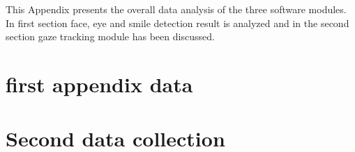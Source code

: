 This Appendix presents the overall data analysis of the three software modules. In first section face, eye and smile detection result is analyzed and in the second section gaze tracking module has been discussed. 
\section{first appendix data}\label{appendixA1}

\section{Second data collection}\label{appendixA2}
